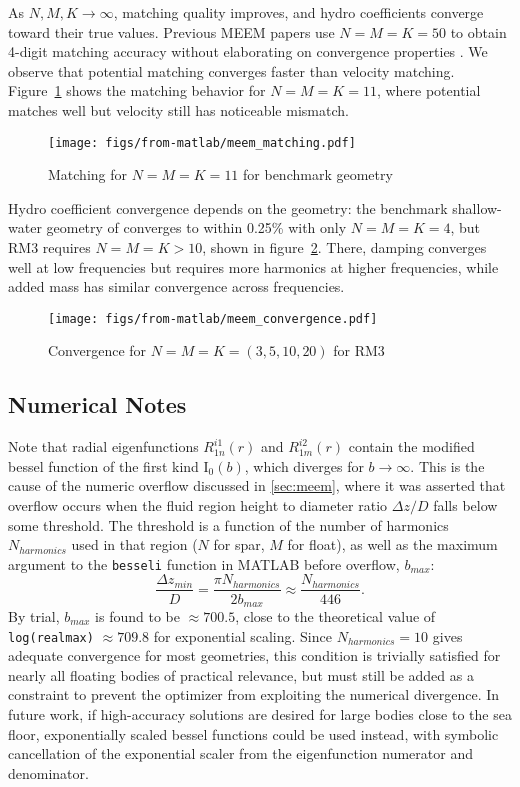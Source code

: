 \begin{appendices}
As $N,M,K\rightarrow\infty$, matching quality improves, and hydro coefficients converge toward their true values.
Previous MEEM papers use $N=M=K=50$ to obtain 4-digit matching accuracy without elaborating on convergence properties \cite{chau_inertia_2012}.
We observe that potential matching converges faster than velocity matching.
Figure~\ref{fig:meem-matching} shows the matching behavior for $N=M=K=11$, where potential matches well but velocity still has noticeable mismatch. 
\begin{figure}
    \centering
    \texttt{[image: figs/from-matlab/meem\_matching.pdf]}
    \caption{Matching for $N=M=K=11$ for benchmark geometry}
    \label{fig:meem-matching}
\end{figure}

Hydro coefficient convergence depends on the geometry: the benchmark shallow-water geometry of \cite{chau_inertia_2012} converges to within 0.25\% with only $N=M=K=4$, but RM3 requires $N=M=K>10$, shown in figure~\ref{fig:meem-convergence}.
There, damping converges well at low frequencies but requires more harmonics at higher frequencies, while added mass has similar convergence across frequencies. 
\begin{figure}
    \centering
    \texttt{[image: figs/from-matlab/meem\_convergence.pdf]}
    \caption{Convergence for $N=M=K=(3,5,10,20)$ for RM3}
    \label{fig:meem-convergence}
\end{figure}


\subsection{Numerical Notes}\label{sec:meem-numerics}
Note that radial eigenfunctions $R_{1n}^{i1}(r)$ and $R_{1m}^{i2}(r)$ contain the modified bessel function of the first kind $\mathrm{I}_0(b)$, which diverges for $b\rightarrow \infty$.
This is the cause of the numeric overflow discussed in \ref{sec:meem}, where it was asserted that overflow occurs when the fluid region height to diameter ratio $\Delta z / D$ falls below some threshold.
The threshold is a function of the number of harmonics $N_{harmonics}$ used in that region ($N$ for spar, $M$ for float), as well as the maximum argument to the \texttt{besseli} function in MATLAB before overflow, $b_{max}$:
\begin{equation}\label{eq:delta-z-min}
    \frac{\Delta z_{min}}{D} = \frac{\pi N_{harmonics}}{2b_{max}} \approx \frac{N_{harmonics}}{446}.
\end{equation}
By trial, $b_{max}$ is found to be $\approx 700.5$, close to the theoretical value of \texttt{log(realmax)} $\approx 709.8$ for exponential scaling.
Since $N_{harmonics}=10$ gives adequate convergence for most geometries, this condition is trivially satisfied for nearly all floating bodies of practical relevance, but must still be added as a constraint to prevent the optimizer from exploiting the numerical divergence.
In future work, if high-accuracy solutions are desired for large bodies close to the sea floor, exponentially scaled bessel functions could be used instead, with symbolic cancellation of the exponential scaler from the eigenfunction numerator and denominator.


\end{appendices}
